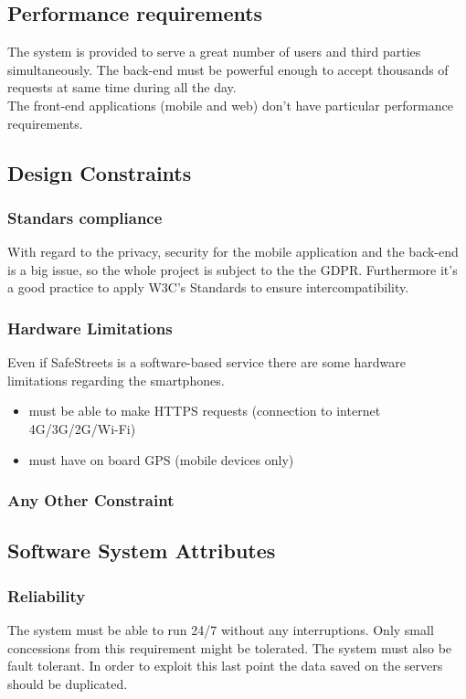 \documentclass{article}
\begin{document}
\newpage
\subsection{Performance requirements}
The system is provided to serve a great number of users and third parties
simultaneously. The back-end must be powerful enough to accept thousands of
requests at same time during all the day.\\
The front-end applications (mobile and web) don't have particular performance
requirements.
\subsection{Design Constraints}
\subsubsection{Standars compliance}
With regard to the privacy, security for the mobile application and the back-end
is a big issue, so the whole project is subject to the the GDPR. Furthermore
it's a good practice to apply W3C's Standards to ensure intercompatibility.
\subsubsection{Hardware Limitations}
Even if SafeStreets is a software-based service there are some hardware
limitations regarding the smartphones.
\begin{itemize}
    \item must be able to make HTTPS requests (connection to internet
    4G/3G/2G/Wi-Fi)
    \item must have on board GPS (mobile devices only)
\end{itemize}
\subsubsection{Any Other Constraint}
\subsection{Software System Attributes}
\subsubsection{Reliability}
The system must be able to run 24/7 without any interruptions. Only small
concessions from this requirement might be tolerated. The system must also be
fault tolerant. In order to exploit this last point the data saved on the
servers should be duplicated.
\end{document}
